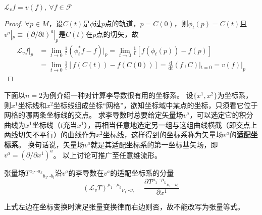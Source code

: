 \begin{theorem}
	$\mathscr{L}_vf = v(f), ~ \forall f \in \mathscr{F}$
\end{theorem}

\begin{proof}
	$\forall p \in M$，设$C(t)$是$\phi$过$p$点的轨道，$p = C(0)$，则$\phi_t(p) = C(t)$且$v^a|_p \equiv (\partial / \partial t)^a|_p$是$C(t)$在$p$点的切矢，故
	$$\begin{aligned}
			\mathscr{L}_vf|_p & = \lim_{t \to 0}\frac{1}{t}(\phi_t^*f - f)|_p = \lim_{t \to 0}\frac{1}{t}[f(\phi_t(p)) - f(p)]                \\
			                  & = \lim_{t \to 0}\frac{1}{t}[f(C(t)) - f(C(0))] = \frac{\mathrm{d}}{\mathrm{d}t}(f \comp C)|_{t = 0} = v(f)|_p
		\end{aligned}$$
\end{proof}

下面以$n = 2$为例介绍一种对计算李导数很有用的坐标系。
设$\{x^1, x^2\}$为坐标系，则$x^1$坐标线和$x^2$坐标线组成坐标``网格''，欲知坐标域中某点的坐标，只须看它位于网格的哪两条坐标线的交点。
求李导数时总要给定矢量场$v^a$，可以选定它的积分曲线为$x^1$坐标线（$t$充当$x^1$），再相当任意地选定另一组与这组曲线横截（即交点上两线切矢不平行）的曲线作为$x^2$坐标线，这样得到的坐标系称为矢量场$v^a$的\textbf{适配坐标系}。
换句话说，矢量场$v^a$就是其适配坐标系的第一坐标基矢场，即$v^a = (\partial / \partial x^1)^a$。
以上讨论可推广至任意维流形。

\begin{theorem}
	张量场$T^{a_1 \cdots a_k}{}_{b_1 \cdots b_l}$沿$v^a$的李导数在$v^a$的适配坐标系的分量
	$$(\mathscr{L}_vT)^{\mu_1 \cdots \mu_k}{}_{\nu_1 \cdots \nu_l} = \frac{\partial T^{\mu_1 \cdots \mu_k}{}_{\nu_1 \cdots \nu_l}}{\partial x^1}$$
\end{theorem}

\begin{note}
	上式左边在坐标变换时满足张量变换律而右边则否，故不能改写为张量等式。
\end{note}

